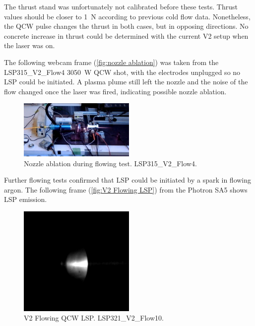         The thrust stand was unfortunately not calibrated before these tests. Thrust values should be closer to \qty{1}{N} according to previous cold flow data. Nonetheless, the QCW pulse changes the thrust in both cases, but in opposing directions. No concrete increase in thrust could be determined with the current V2 setup when the laser was on.

        The following webcam frame (\autoref{fig:nozzle ablation}) was taken from the LSP315\_V2\_Flow4 \qty{3050}{W} QCW shot, with the electrodes unplugged so no LSP could be initiated. A plasma plume still left the nozzle and the noise of the flow changed once the laser was fired, indicating possible nozzle ablation.

        \begin{figure}[!ht]
            \centering
            \includegraphics[width=0.5\textwidth]{assets/5 discussion/Nozzle ablation.png}
            \caption{Nozzle ablation during flowing test. LSP315\_V2\_Flow4.}
            \label{fig:nozzle ablation}
        \end{figure}

        Further flowing tests confirmed that LSP could be initiated by a spark in flowing argon. The following frame (\autoref{fig:V2 Flowing LSP}) from the Photron SA5 shows LSP emission.

        \begin{figure}[!ht]
            \centering
            \includegraphics[width=0.5\textwidth]{assets/4 experiments/LSP321_V2_FLOW10.png}
            \caption{V2 Flowing QCW LSP. LSP321\_V2\_Flow10.}
            \label{fig:V2 Flowing LSP}
        \end{figure}

        



